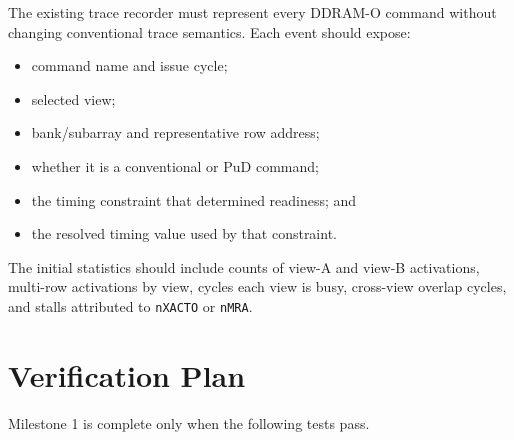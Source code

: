\documentclass[9pt,twocolumn]{extarticle}
\newcommand{\param}[1]{\texttt{#1}}
\begin{document}
The existing trace recorder must represent every DDRAM-O command without
changing conventional trace semantics. Each event should expose:

\begin{itemize}
  \item command name and issue cycle;
  \item selected view;
  \item bank/subarray and representative row address;
  \item whether it is a conventional or PuD command;
  \item the timing constraint that determined readiness; and
  \item the resolved timing value used by that constraint.
\end{itemize}

The initial statistics should include counts of view-A and view-B activations,
multi-row activations by view, cycles each view is busy, cross-view overlap
cycles, and stalls attributed to \param{nXACTO} or \param{nMRA}.

\section{Verification Plan}

Milestone 1 is complete only when the following tests pass.
\end{document}

